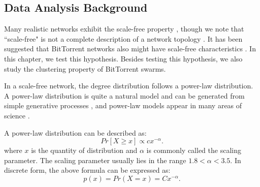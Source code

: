 \subsection{Data Analysis Background}
Many realistic networks exhibit the scale-free property \cite{clauset2009power}, though we note that ``scale-free" is not a complete description of a network topology \cite{doyle2005robust}\cite{mahadevan2006systematic}. 
It has been suggested that BitTorrent networks also might have scale-free characteristics \cite{dale2008evolution}. 
In this chapter, we test this hypothesis. 
Besides testing this hypothesis, we also study the clustering property of BitTorrent swarms. 

In a scale-free network, the degree distribution follows a power-law distribution.   
A power-law distribution is quite a natural model and can be generated from simple generative processes \cite{mitzenmacher2004brief}, and power-law models appear in many areas of science \cite{clauset2009power} \cite{mitzenmacher2004brief}. 

A power-law distribution can be described as:
\begin{equation}
Pr[X\ge x] \propto cx^{-\alpha}.
\label{eq:powerlaw}
\end{equation}
where $x$ is the quantity of distribution and $\alpha$ is commonly called the scaling parameter. 
The scaling parameter usually lies in the range $1.8<\alpha<3.5$.
In discrete form, the above formula can be expressed as:
\begin{equation}
p(x) = Pr(X=x) = Cx^{- \alpha}.
\label{eq:powerlawdiscrete}
\end{equation}


